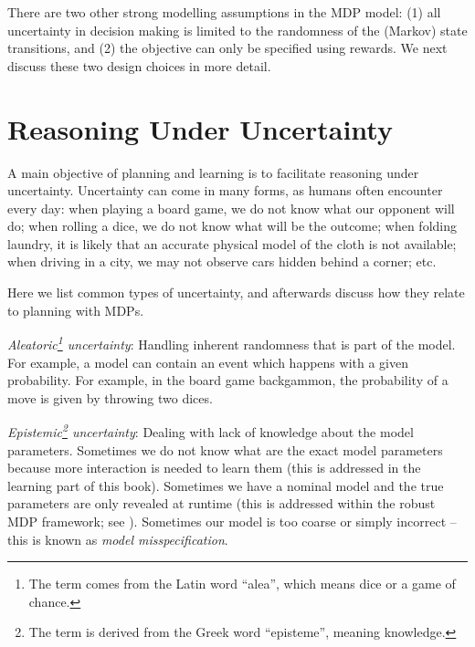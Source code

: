 There are two other strong modelling assumptions in the MDP model:  (1) all uncertainty in decision making is limited to the randomness of the (Markov) state transitions, and (2) the objective can only be specified using rewards. We next discuss these two design choices in more detail.


\section{Reasoning Under Uncertainty}

A main objective of planning and learning is to facilitate reasoning under uncertainty. Uncertainty can come in many forms, as humans often encounter every day: when playing a board game, we do not know what our opponent will do; when rolling a dice, we do not know what will be the outcome; when folding laundry, it is likely that an accurate physical model of the cloth is not available; when driving in a city, we may not observe cars hidden behind a corner; etc. 




Here we list common types of uncertainty, and afterwards discuss how they relate to planning with MDPs. 

    {\em Aleatoric\footnote{The term comes from the Latin word ``alea'', which means dice or a game of chance.} uncertainty}: Handling inherent randomness that is part of the model. For example, a model can contain an event which happens with a given probability. For example, in the board game backgammon, the probability of a move is given by throwing two dices.
    
    {\em Epistemic\footnote{The term is derived from the Greek word ``episteme'', meaning knowledge.} uncertainty}: Dealing with lack of knowledge about the model parameters. Sometimes we do not know what are the exact model parameters because more interaction is needed to learn them (this is addressed in the learning part of this book). Sometimes we have a nominal model and the true parameters are only  revealed at runtime (this is addressed within the robust MDP framework; see \cite{nilim2005robust}). Sometimes our model is too coarse or simply incorrect -- this is known as {\em model misspecification}.
    
